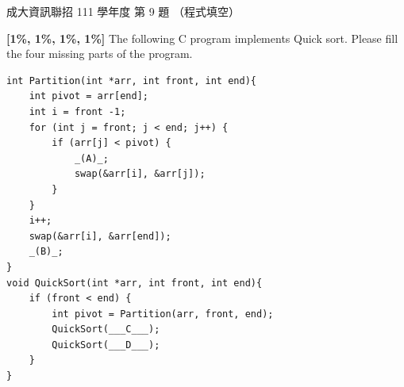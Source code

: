 \begin{pastexam}[label={px:ncku-111-prog-09}]{成大資訊聯招 111 學年度 第 9 題}
（程式填空）

\textbf{[1\%, 1\%, 1\%, 1\%]} The following C program implements Quick sort. Please fill the four missing parts of the program.
\begin{verbatim}
int Partition(int *arr, int front, int end){
    int pivot = arr[end];
    int i = front -1;
    for (int j = front; j < end; j++) {
        if (arr[j] < pivot) {
            _(A)_;
            swap(&arr[i], &arr[j]);
        }
    }
    i++;
    swap(&arr[i], &arr[end]);
    _(B)_;
}
void QuickSort(int *arr, int front, int end){
    if (front < end) {
        int pivot = Partition(arr, front, end);
        QuickSort(___C___);
        QuickSort(___D___);
    }
}
\end{verbatim}
\end{pastexam}

